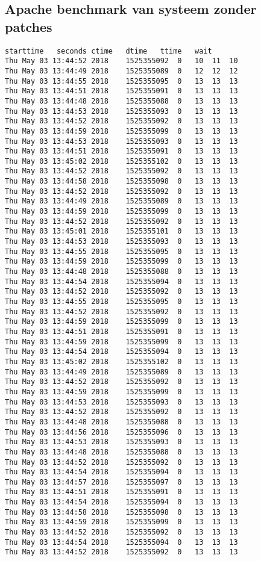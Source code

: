 \subsection{Apache benchmark van systeem zonder patches}

\begin{lstlisting}[caption={Eerste 50 resultaten}, basicstyle=\footnotesize]
starttime	seconds	ctime	dtime	ttime	wait
Thu May 03 13:44:52 2018	1525355092	0	10	11	10
Thu May 03 13:44:49 2018	1525355089	0	12	12	12
Thu May 03 13:44:55 2018	1525355095	0	13	13	13
Thu May 03 13:44:51 2018	1525355091	0	13	13	13
Thu May 03 13:44:48 2018	1525355088	0	13	13	13
Thu May 03 13:44:53 2018	1525355093	0	13	13	13
Thu May 03 13:44:52 2018	1525355092	0	13	13	13
Thu May 03 13:44:59 2018	1525355099	0	13	13	13
Thu May 03 13:44:53 2018	1525355093	0	13	13	13
Thu May 03 13:44:51 2018	1525355091	0	13	13	13
Thu May 03 13:45:02 2018	1525355102	0	13	13	13
Thu May 03 13:44:52 2018	1525355092	0	13	13	13
Thu May 03 13:44:58 2018	1525355098	0	13	13	13
Thu May 03 13:44:52 2018	1525355092	0	13	13	13
Thu May 03 13:44:49 2018	1525355089	0	13	13	13
Thu May 03 13:44:59 2018	1525355099	0	13	13	13
Thu May 03 13:44:52 2018	1525355092	0	13	13	13
Thu May 03 13:45:01 2018	1525355101	0	13	13	13
Thu May 03 13:44:53 2018	1525355093	0	13	13	13
Thu May 03 13:44:55 2018	1525355095	0	13	13	13
Thu May 03 13:44:59 2018	1525355099	0	13	13	13
Thu May 03 13:44:48 2018	1525355088	0	13	13	13
Thu May 03 13:44:54 2018	1525355094	0	13	13	13
Thu May 03 13:44:52 2018	1525355092	0	13	13	13
Thu May 03 13:44:55 2018	1525355095	0	13	13	13
Thu May 03 13:44:52 2018	1525355092	0	13	13	13
Thu May 03 13:44:59 2018	1525355099	0	13	13	13
Thu May 03 13:44:51 2018	1525355091	0	13	13	13
Thu May 03 13:44:59 2018	1525355099	0	13	13	13
Thu May 03 13:44:54 2018	1525355094	0	13	13	13
Thu May 03 13:45:02 2018	1525355102	0	13	13	13
Thu May 03 13:44:49 2018	1525355089	0	13	13	13
Thu May 03 13:44:52 2018	1525355092	0	13	13	13
Thu May 03 13:44:59 2018	1525355099	0	13	13	13
Thu May 03 13:44:53 2018	1525355093	0	13	13	13
Thu May 03 13:44:52 2018	1525355092	0	13	13	13
Thu May 03 13:44:48 2018	1525355088	0	13	13	13
Thu May 03 13:44:56 2018	1525355096	0	13	13	13
Thu May 03 13:44:53 2018	1525355093	0	13	13	13
Thu May 03 13:44:48 2018	1525355088	0	13	13	13
Thu May 03 13:44:52 2018	1525355092	0	13	13	13
Thu May 03 13:44:54 2018	1525355094	0	13	13	13
Thu May 03 13:44:57 2018	1525355097	0	13	13	13
Thu May 03 13:44:51 2018	1525355091	0	13	13	13
Thu May 03 13:44:54 2018	1525355094	0	13	13	13
Thu May 03 13:44:58 2018	1525355098	0	13	13	13
Thu May 03 13:44:59 2018	1525355099	0	13	13	13
Thu May 03 13:44:52 2018	1525355092	0	13	13	13
Thu May 03 13:44:54 2018	1525355094	0	13	13	13
Thu May 03 13:44:52 2018	1525355092	0	13	13	13

\end{lstlisting}


